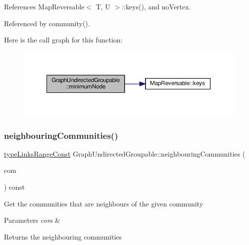 References Map\+Reversable$<$ T, U $>$\+::keys(), and no\+Vertex.



Referenced by community().

Here is the call graph for this function\+:
\nopagebreak
\begin{figure}[H]
\begin{center}
\leavevmode
\includegraphics[width=350pt]{classGraphUndirectedGroupable_a0ce165b4c68150f60ccd1977b83f3eb3_cgraph}
\end{center}
\end{figure}
\mbox{\label{classGraphUndirectedGroupable_a48823a0162b95a72c22d0ab01a709e1f}} 
\subsubsection{\texorpdfstring{neighbouring\+Communities()}{neighbouringCommunities()}}
{\footnotesize\ttfamily \hyperlink{graphInterface_8h_ae8d27008f15586bbf419af7ad2e0a48a}{type\+Links\+Range\+Const} Graph\+Undirected\+Groupable\+::neighbouring\+Communities (\begin{DoxyParamCaption}\item[{const \hyperlink{graphUndirectedGroupable_8h_a914da95c9ea7f14f4b7f875c36818556}{type\+Community} \&}]{com }\end{DoxyParamCaption}) const\hspace{0.3cm}{\ttfamily [inline]}}

Get the communities that are neighbours of the given community


\begin{DoxyParams}{Parameters}
{\em com} & \\
\hline
\end{DoxyParams}
\begin{DoxyReturn}{Returns}
the neighbouring communities 
\end{DoxyReturn}



